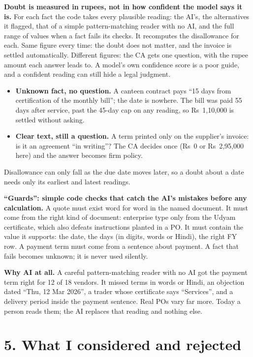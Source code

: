 \documentclass[10pt,a4paper]{article}
\providecommand{\tightlist}{\setlength{\itemsep}{1.5pt}\setlength{\parskip}{0pt}}
\begin{document}
\textbf{Doubt is measured in rupees, not in how confident the model says it is.} For each fact the code takes every plausible reading: the AI's, the alternatives it flagged, that of a simple pattern-matching reader with no AI, and the full range of values when a fact fails its checks. It recomputes the disallowance for each. Same figure every time: the doubt does not matter, and the invoice is settled automatically. Different figures: the CA gets one question, with the rupee amount each answer leads to. A model's own confidence score is a poor guide, and a confident reading can still hide a legal judgment.

\begin{itemize}
\tightlist
\item
  \textbf{Unknown fact, no question.} A canteen contract pays ``15 days from certification of the monthly bill''; the date is nowhere. The bill was paid 55 days after service, past the 45-day cap on any reading, so Rs~1,10,000 is settled without asking.
\item
  \textbf{Clear text, still a question.} A term printed only on the supplier's invoice: is it an agreement ``in writing''? The CA decides once (Rs~0 or Rs~2,95,000 here) and the answer becomes firm policy.
\end{itemize}

Disallowance can only fall as the due date moves later, so a doubt about a date needs only its earliest and latest readings.

\textbf{``Guards'': simple code checks that catch the AI's mistakes before any calculation.} A quote must exist word for word in the named document. It must come from the right kind of document: enterprise type only from the Udyam certificate, which also defeats instructions planted in a PO. It must contain the value it supports: the date, the days (in digits, words or Hindi), the right FY row. A payment term must come from a sentence about payment. A fact that fails becomes unknown; it is never used silently.

\textbf{Why AI at all.} A careful pattern-matching reader with no AI got the payment term right for 12 of 18 vendors. It missed terms in words or Hindi, an objection dated ``Thu, 12 Mar 2026'', a trader whose certificate says ``Services'', and a delivery period inside the payment sentence. Real POs vary far more. Today a person reads them; the AI replaces that reading and nothing else.

\section*{5. What I considered and rejected}
\end{document}
